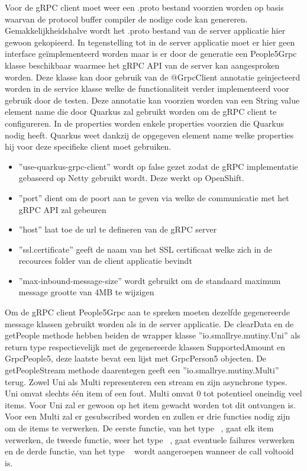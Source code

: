 Voor de gRPC client moet weer een .proto bestand voorzien worden op basis waarvan de protocol buffer compiler de nodige code kan genereren. Gemakkelijkheidshalve wordt het
.proto bestand van de server applicatie hier gewoon gekopieerd. In tegenstelling tot in de server applicatie moet er hier geen interface geïmplementeerd worden maar
is er door de generatie een People5Grpc klasse beschikbaar waarmee het gRPC API van de server kan aangesproken worden. Deze klasse kan door gebruik van de
@GrpcClient annotatie geinjecteerd worden in de service klasse welke de functionaliteit verder implementeerd voor gebruik door de testen. Deze annotatie
kan voorzien worden van een String value element name die door Quarkus zal gebruikt worden om de gRPC client te configureren. In de properties worden enkele properties voorzien
die Quarkus nodig heeft. Quarkus weet dankzij de opgegeven element name welke properties hij voor deze specifieke client moet gebruiken.\newline

\begin{itemize}
    \item ''use-quarkus-grpc-client'' wordt op false gezet zodat de gRPC implementatie gebaseerd op Netty gebruikt wordt. Deze werkt op OpenShift.
    \item ''port'' dient om de poort aan te geven via welke de communicatie met het gRPC API zal gebeuren
    \item ''host'' laat toe de url te defineren van de gRPC server
    \item ''ssl.certificate'' geeft de naam van het SSL certificaat welke zich in de recources folder van de client applicatie bevindt
    \item ''max-inbound-message-size'' wordt gebruikt om de standaard maximum message grootte van 4MB te wijzigen
\end{itemize}

Om de gRPC client People5Grpc aan te spreken moeten dezelfde gegenereerde message klassen gebruikt worden als in de server applicatie.
De clearData en de getPeople methode hebben beiden de wrapper klasse ''io.smallrye.mutiny.Uni'' als return type respectievelijk met de gegenereerde klassen
SupportedAmount en GrpcPeople5, deze laatste bevat een lijst met GrpcPerson5 objecten. De getPeopleStream methode daarentegen geeft een ''io.smallrye.mutiny.Multi'' terug.
Zowel Uni als Multi representeren een stream en zijn asynchrone types. Uni omvat slechts één item of een fout. Multi omvat 0 tot potentieel oneindig veel items.
Voor Uni zal er gewoon op het item gewacht worden tot dit ontvangen is. Voor een Multi zal er gesubscribed worden en zullen er drie functies nodig zijn om
de items te verwerken. De eerste functie, van het type ~\parencite{Consumer}, gaat elk item verwerken, de tweede functie, weer het type ~\parencite{Consumer},
gaat eventuele failures verwerken en de derde functie, van het type ~\parencite{Runnable} wordt aangeroepen wanneer de call voltooid is.\newline

